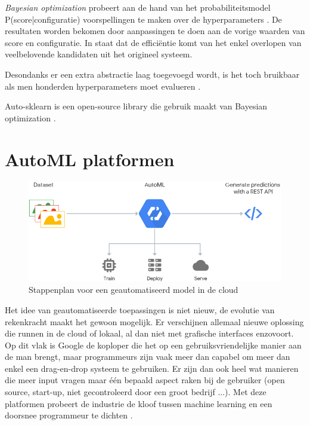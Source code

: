 \textit{Bayesian optimization} probeert aan de hand van het probabiliteitsmodel P(score|configuratie) voorspellingen te maken over de hyperparameters \autocite{Bergstra2013}. De resultaten worden bekomen door aanpassingen te doen aan de vorige waarden van score en configuratie. In \textcite{Bergstra2013} staat dat de efficiëntie komt van het enkel overlopen van veelbelovende kandidaten uit het origineel systeem.

Desondanks er een extra abstractie laag toegevoegd wordt, is het toch bruikbaar als men honderden hyperparameters moet evalueren \autocite{Bergstra2013}.

Auto-sklearn is een open-source library die gebruik maakt van Bayesian optimization \autocite{Feurer2015}. 

\section{AutoML platformen}
\label{sec:automl-platformen}

\begin{figure}
    \includegraphics[width=\linewidth]{img/google-cloud-automl.png}
    \caption{Stappenplan voor een geautomatiseerd model in de cloud \autocite{Google2019}}
    \label{fig:google-cloud-automl}
\end{figure}

Het idee van geautomatiseerde toepassingen is niet nieuw, de evolutie van rekenkracht maakt het gewoon mogelijk. Er verschijnen allemaal nieuwe oplossing die runnen in de cloud of lokaal, al dan niet met grafische interfaces enzovoort. Op dit vlak is Google de koploper die het op een gebruiksvriendelijke manier aan de man brengt, maar programmeurs zijn vaak meer dan capabel om meer dan enkel een drag-en-drop systeem te gebruiken. Er zijn dan ook heel wat manieren die meer input vragen maar één bepaald aspect raken bij de gebruiker (open source, start-up, niet gecontroleerd door een groot bedrijf ...). Met deze platformen probeert de industrie de kloof tussen machine learning en een doorsnee programmeur te dichten \autocite{Gutierrez2019}.

